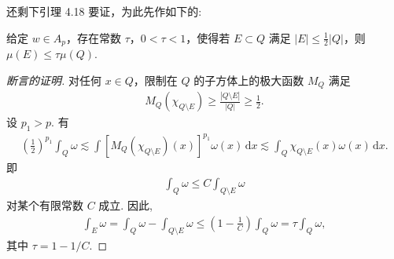 还剩下引理 4.18 要证，为此先作如下的:

\begin{claim*}
给定 $w \in A_p$，存在常数 $\tau$，$0 < \tau < 1$，使得若 $E \subset Q$ 满足 $|E| \leq \frac{1}{2}|Q|$，则 $\mu(E) \leq \tau\mu(Q)$.
\end{claim*}

\begin{proof}[断言的证明]
对任何 $x \in Q$，限制在 $Q$ 的子方体上的极大函数 $M_Q$ 满足
\begin{align*}
  M_{Q}(\chi_{Q\setminus E})\geq\frac{|Q\setminus E|}{|Q|}\geq\frac{1}{2}.
\end{align*}
设 $p_{1} > p$. 有
\begin{align*}
  \left(\frac{1}{2}\right)^{p_{1}}\int_{Q}\omega
  \lesssim\int\left[M_{Q}(\chi_{Q\setminus E})(x)\right]^{p_{1}}\omega(x)\,\mathrm{d}x
  \lesssim\int_{Q}\chi_{Q\setminus E}(x)\omega(x)\,\mathrm{d}x.
\end{align*}
即
\begin{align*}
  \int_{Q}\omega\leq C\int_{Q\setminus E}\omega
\end{align*}
对某个有限常数 $C$ 成立. 因此,
\begin{align*}
  \int_{E}\omega=\int_{Q}\omega-\int_{Q\setminus E}\omega
  \leq\left(1-\frac{1}{C}\right)\int_{Q}\omega=\tau\int_{Q}\omega,
\end{align*}
其中 $\tau = 1 - 1/C$.
\end{proof}

